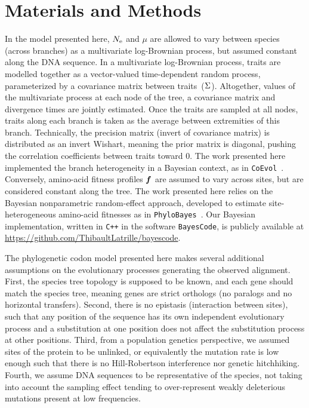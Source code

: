 \documentclass{MBE}
\begin{document}
	\section{Materials and Methods}
	\label{sec:MatMet}

	In the model presented here, $N_{\text{e}}$ and $\mu$ are allowed to vary between species (across branches) as a multivariate log-Brownian process, but assumed constant along the {DNA} sequence.
	In a multivariate log-Brownian process, traits are modelled together as a vector-valued time-dependent random process, parameterized by a covariance matrix between traits~($\Sigma$).
	Altogether, values of the multivariate process at each node of the tree, a covariance matrix and divergence times are jointly estimated.
	Once the traits are sampled at all nodes, traits along each branch is taken as the average between extremities of this branch.
	Technically, the precision matrix (invert of covariance matrix) is distributed as an invert Wishart, meaning the {prior} matrix is diagonal, pushing the correlation coefficients between traits toward $0$.
	The work presented here implemented the branch heterogeneity in a Bayesian context, as in \texttt{CoEvol}~\citep{Lartillot2011}.
	Conversely, amino-acid fitness profiles $\bm{f}$ are assumed to vary across sites, but are considered constant along the tree.
	The work presented here relies on the Bayesian nonparametric random-effect approach, developed to estimate site-heterogeneous amino-acid fitnesses as in \texttt{PhyloBayes}~\citep{Rodrigue2010}.
	Our Bayesian implementation, written in \texttt{C++} in the software \texttt{BayesCode}, is publicly available at \url{https://github.com/ThibaultLatrille/bayescode}.

	The phylogenetic {codon} model presented here makes several additional assumptions on the evolutionary processes generating the observed alignment.
	First, the species tree topology is supposed to be known, and each gene should match the species tree, meaning genes are strict orthologs (no paralogs and no horizontal transfers).
	Second, there is no epistasis (interaction between sites), such that any position of the sequence has its own independent evolutionary process and a {substitution} at one position does not affect the {substitution} process at other positions.
	Third, from a population genetics perspective, we assumed sites of the protein to be unlinked, or equivalently the mutation rate is low enough such that there is no Hill-Robertson interference nor genetic hitchhiking.
	Fourth, we assume {DNA} sequences to be representative of the species, not taking into account the sampling effect tending to over-represent weakly deleterious mutations present at low frequencies.
\end{document}
